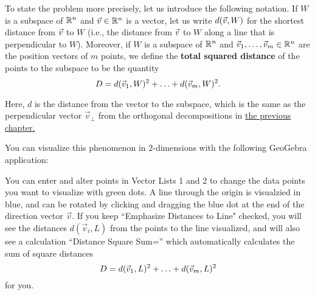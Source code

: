 \documentclass{ximera}
\begin{document}
To state the problem more precisely, let us introduce the following
notation. If $W$ is a subspace of $\mathbb{R}^n$ and $\vec{v}\in\mathbb{R}^n$ is a
vector, let us write $d(\vec{v},W)$ for the shortest distance from
$\vec{v}$ to $W$ (i.e., the distance from $\vec{v}$ to $W$ along a
line that is perpendicular to $W$). Moreover, if $W$ is a subspace of
$\mathbb{R}^n$ and $\vec{v}_1,\ldots,\vec{v}_m\in\mathbb{R}^n$ are the position
vectors of $m$ points, we define the \textbf{total squared distance}%
%
%
%
 of the points to
the subspace to be the quantity
\begin{equation*}
  D = d(\vec{v}_1,W)^2 + \ldots + d(\vec{v}_m,W)^2.
\end{equation*}

Here, $d$ is the distance from the vector to the subspace, which is the same as the perpendicular vector $\vec{v}_\perp$ from the orthogonal decompositions in \href{https://ximera.osu.edu/appliedlinearalgebra/c5ChapterFive/learningActivities/m5LearningActivities/m5DotProduct/orthogonalityThree}{the previous chapter.}

You can visualize this phenomenon in $2$-dimensions with the following GeoGebra application:

\begin{center}
\end{center}



You can enter and alter points in Vector Lists 1 and 2 to change the data points you want to visualize with green dots. A line through the origin is visualzied in blue, and can be rotated by clicking and dragging the blue dot at the end of the direction vector $\vec{v}$. If you keep ``Emphasize Distances to Line" checked, you will see the distances $d(\vec{v}_i,L)$ from the points to the line visualized, and will also see a calculation ``Distance Square Sum='' which automatically calculates the sum of square distances \begin{equation*}
  D = d(\vec{v}_1,L)^2 + \ldots + d(\vec{v}_m,L)^2
\end{equation*} for you.
\end{document}
